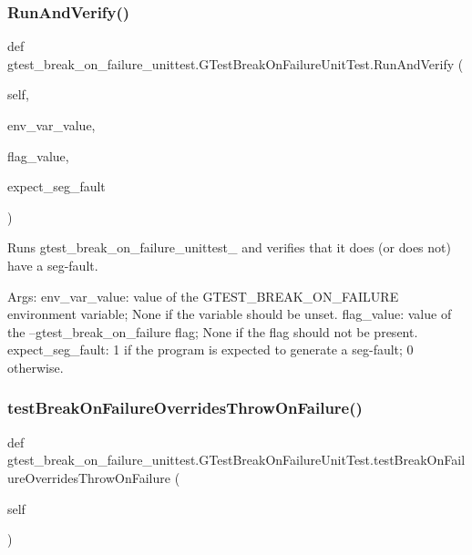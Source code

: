 \subsubsection{\texorpdfstring{Run\+And\+Verify()}{RunAndVerify()}}
{\footnotesize\ttfamily def gtest\+\_\+break\+\_\+on\+\_\+failure\+\_\+unittest.\+G\+Test\+Break\+On\+Failure\+Unit\+Test.\+Run\+And\+Verify (\begin{DoxyParamCaption}\item[{}]{self,  }\item[{}]{env\+\_\+var\+\_\+value,  }\item[{}]{flag\+\_\+value,  }\item[{}]{expect\+\_\+seg\+\_\+fault }\end{DoxyParamCaption})}

\begin{DoxyVerb}Runs gtest_break_on_failure_unittest_ and verifies that it does
(or does not) have a seg-fault.

Args:
  env_var_value:    value of the GTEST_BREAK_ON_FAILURE environment
                variable; None if the variable should be unset.
  flag_value:       value of the --gtest_break_on_failure flag;
                None if the flag should not be present.
  expect_seg_fault: 1 if the program is expected to generate a seg-fault;
                0 otherwise.
\end{DoxyVerb}
 \mbox{\label{classgtest__break__on__failure__unittest_1_1_g_test_break_on_failure_unit_test_a3c5855e045236a309a5bff73ee6b503e}} 
\subsubsection{\texorpdfstring{test\+Break\+On\+Failure\+Overrides\+Throw\+On\+Failure()}{testBreakOnFailureOverridesThrowOnFailure()}}
{\footnotesize\ttfamily def gtest\+\_\+break\+\_\+on\+\_\+failure\+\_\+unittest.\+G\+Test\+Break\+On\+Failure\+Unit\+Test.\+test\+Break\+On\+Failure\+Overrides\+Throw\+On\+Failure (\begin{DoxyParamCaption}\item[{}]{self }\end{DoxyParamCaption})}

